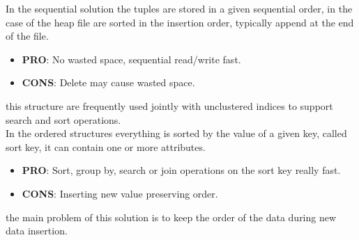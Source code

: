 \documentclass[12pt]{article}
\begin{document}
In the sequential solution the tuples are stored in a given sequential order, in the case of the heap file are sorted in the insertion order, typically append at the end of the file.
\begin{itemize}
  \item \textbf{PRO}: No wasted space, sequential read/write fast.
  \item \textbf{CONS}: Delete may cause wasted space.
\end{itemize}
this structure are frequently used jointly with unclustered indices to support search and sort operations.\\
In the ordered structures everything is sorted by the value of a given key, called sort key, it can contain one or more attributes.
\begin{itemize}
  \item \textbf{PRO}: Sort, group by, search or join operations on the sort key really fast.
  \item \textbf{CONS}: Inserting new value preserving order.
\end{itemize}
the main problem of this solution is to keep the order of the data during new data insertion.



\end{document}
